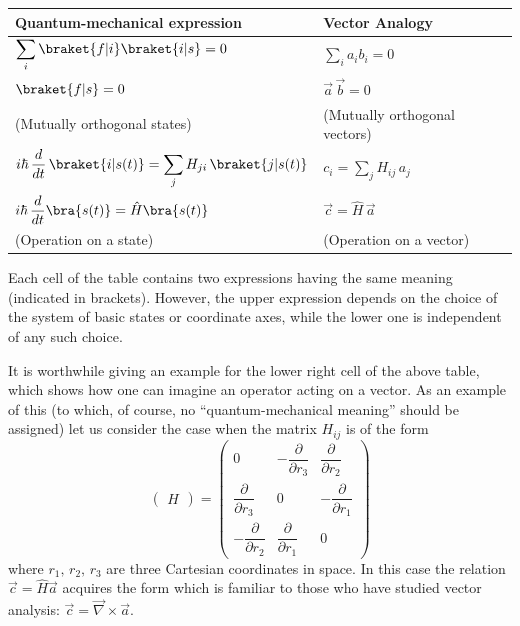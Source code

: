 \documentclass[a4paper,sfsidenotes,colorlinks=true]{tufte-book}
\numberwithin{equation}{section}
\numberwithin{figure}{section}
\begin{document}
\begin{table}
\begin{tabular}{ll}
\toprule
\textbf{Quantum-mechanical expression} & \textbf{Vector Analogy}\\[8pt]
\midrule
\vspace*{5pt}
$\displaystyle\sum_{i} \braket{f|i}\braket{i|s} = 0$ & $\displaystyle\sum_{i} a_{i}b_{i} =0$ \\ [5pt] 
$\braket{f|s} =0 $ & $\vec{a} \, 
\vec{b} = 0$\\
(Mutually orthogonal states) &  (Mutually orthogonal vectors) \\[3pt]
\midrule
$i \hbar \, \dfrac{d}{dt} \, \braket{i|s(t)} = \displaystyle\sum_{j} H_{ji}
\, \braket{j|s(t)}$ & $c_{i} = \displaystyle\sum_{j} H_{ij} \, a_{j}$ \\[8pt]
$i \hbar \, \dfrac{d}{dt} \bra{s(t)} = \hat{H} \bra{s(t)}$ & $\vec{c}
= \hat{H} \, \vec{a}$\\[3pt]
(Operation on a state) & (Operation on a vector)\\
\bottomrule
\end{tabular}
\label{vector-analogy-table}
\end{table}

Each cell of the table contains two expressions having the same
meaning (indicated in brackets). However, the upper expression depends
on the choice of the system of basic states or coordinate axes, while
the lower one is independent of any such choice.


It is worthwhile giving an example for the lower right cell of the
above table, which shows how one can imagine an operator acting on a
vector. As an example of this (to which, of course, no
``quantum-mechanical meaning'' should be assigned) let us consider the
case when the matrix $H_{ij}$ is of the form 
\begin{equation*}
\begin{pmatrix}
H
\end{pmatrix}
=
\begin{pmatrix}
0 & -\dfrac{\partial}{\partial r_{3}} &  \dfrac{\partial}{\partial
  r_{2}}\\
\dfrac{\partial}{\partial r_{3}} & 0 & -\dfrac{\partial}{\partial r_{1}}
\\
-\dfrac{\partial}{\partial r_{2}} & \dfrac{\partial}{\partial r_{1}} &
0 
\end{pmatrix}
\end{equation*}
where $r_{1}, \, r_{2}, \, r_{3}$ are three Cartesian coordinates in
space. In this case the relation $\vec{c} = \hat{H} \vec{a}$ acquires
the form which is familiar to those who have studied vector analysis:
$\vec{c} = \vec{\nabla} \times \vec{a}$.
\end{document}
